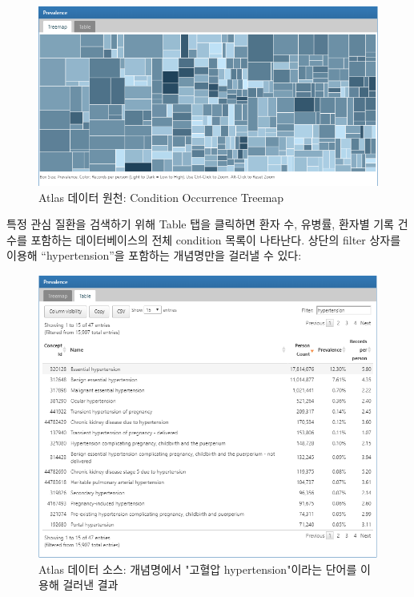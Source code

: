 \documentclass[10.5pt]{book}
\theoremstyle{definition}
\theoremstyle{definition}
\theoremstyle{definition}
\theoremstyle{remark}
\begin{document}
\begin{figure}

{\centering \includegraphics[width=1\linewidth]{images/Characterization/atlasDataSourcesConditionTreemap} 

}

\caption{Atlas 데이터 원천: Condition Occurrence Treemap}\label{fig:atlasDataSourcesConditionTreemap}
\end{figure}

특정 관심 질환을 검색하기 위해 Table 탭을 클릭하면 환자 수, 유병률,
환자별 기록 건수를 포함하는 데이터베이스의 전체 condition 목록이
나타난다. 상단의 filter 상자를 이용해 ``hypertension''을 포함하는
개념명만을 걸러낼 수 있다:

\begin{figure}

{\centering \includegraphics[width=1\linewidth]{images/Characterization/atlasDataSourcesConditionFiltered} 

}

\caption{Atlas 데이터 소스: 개념명에서 "고혈압 hypertension"이라는 단어를 이용해 걸러낸 결과}\label{fig:atlasDataSourcesConditionFiltered}
\end{figure}
\end{document}
